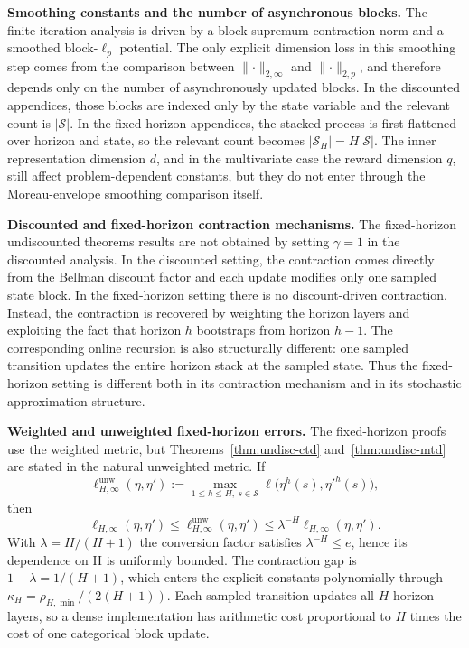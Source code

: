 \documentclass{article}
\newcommand{\X}{\mathcal{S}}
\begin{document}
\noindent\textbf{Smoothing constants and the number of asynchronous blocks.}
The finite-iteration analysis is driven by a block-supremum contraction norm and a smoothed block-$\ell_p$ potential. The only explicit dimension loss in this smoothing step comes from the comparison between $\lVert \cdot \rVert_{2,\infty}$ and $\lVert \cdot \rVert_{2,p}$, and therefore depends only on the number of asynchronously updated blocks. In the discounted appendices, those blocks are indexed only by the state variable and the relevant count is $\lvert \X \rvert$. In the fixed-horizon appendices, the stacked process is first flattened over horizon and state, so the relevant count becomes $\lvert \mathcal S_H \rvert = H\lvert \X \rvert$. The inner representation dimension $d$, and in the multivariate case the reward dimension $q$, still affect problem-dependent constants, but they do not enter through the Moreau-envelope smoothing comparison itself.

\noindent\textbf{Discounted and fixed-horizon contraction mechanisms.}
The fixed-horizon undiscounted theorems results are not obtained by setting $\gamma=1$ in the discounted analysis. In the discounted setting, the contraction comes directly from the Bellman discount factor and each update modifies only one sampled state block. In the fixed-horizon setting there is no discount-driven contraction. Instead, the contraction is recovered by weighting the horizon layers and exploiting the fact that horizon $h$ bootstraps from horizon $h-1$. The corresponding online recursion is also structurally different: one sampled transition updates the entire horizon stack at the sampled state. Thus the fixed-horizon setting is different both in its contraction mechanism and in its stochastic approximation structure.

\noindent\textbf{Weighted and unweighted fixed-horizon errors.}
The fixed-horizon proofs use the weighted metric, but Theorems~\ref{thm:undisc-ctd} and~\ref{thm:undisc-mtd} are stated in the natural unweighted metric. If
\begin{equation}
\ell_{H,\infty}^{\mathrm{unw}}(\eta,\eta'):=\max_{1\le h\le H,\ s\in\X}\ell\bigl(\eta^h(s),{\eta'}^h(s)\bigr),
\end{equation}
then
\begin{equation}
\ell_{H,\infty}(\eta,\eta')\le\ell_{H,\infty}^{\mathrm{unw}}(\eta,\eta')\le\lambda^{-H}\ell_{H,\infty}(\eta,\eta').
\end{equation}
With $\lambda=H/(H+1)$ the conversion factor satisfies $\lambda^{-H}\le e$, hence its dependence on H is uniformly bounded. The contraction gap is $1-\lambda=1/(H+1)$, which enters the explicit constants polynomially through $\kappa_H=\rho_{H,\min}/(2(H+1))$. Each sampled transition updates all $H$ horizon layers, so a dense implementation has arithmetic cost proportional to $H$ times the cost of one categorical block update.
\end{document}
